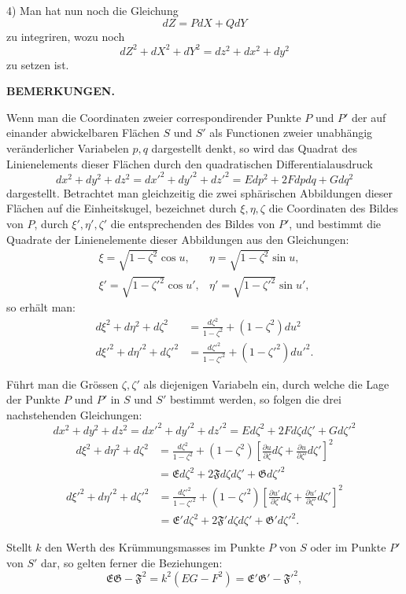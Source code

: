\par
4) Man hat nun noch die Gleichung
\[
dZ=PdX+QdY
\]
\noindent zu integriren, wozu noch
\[
dZ^2+dX^2+dY^2=dz^2+dx^2+dy^2
\]
\noindent zu setzen ist.

\begin{center}\textbf{BEMERKUNGEN.}\end{center}
\noindent\hspace*{1.2em}Wenn man die Coordinaten zweier correspondirender Punkte $P$ und $P'$ der auf einander abwickelbaren Flächen $S$ und $S'$ als Functionen zweier unabhängig veränderlicher Variabelen $p,q$ dargestellt denkt, so wird das Quadrat des Linienelements dieser Flächen durch den quadratischen Differentialausdruck
\[
dx^2+dy^2+dz^2=dx'^2+dy'^2+dz'^2=Edp^2+2Fdpdq+Gdq^2
\]
\noindent dargestellt. Betrachtet man gleichzeitig die zwei sphärischen Abbildungen dieser Flächen auf die Einheitskugel, bezeichnet durch $\xi,\eta,\zeta$ die Coordinaten des Bildes von $P$, durch $\xi',\eta',\zeta'$ die entsprechenden des Bildes von $P'$, und bestimmt die Quadrate der Linienelemente dieser Abbildungen aus den Gleichungen:
\[
\begin{array}{ll}
\xi=\sqrt{1-\zeta^2}\cos u,&\eta=\sqrt{1-\zeta^2}\sin u,\\[4pt]
\xi'=\sqrt{1-\zeta'^2}\cos u',&\eta'=\sqrt{1-\zeta'^2}\sin u',
\end{array}
\]
\noindent so erhält man:
\[
\begin{aligned}
d\xi^2+d\eta^2+d\zeta^2&=\frac{d\zeta^2}{1-\zeta^2}+(1-\zeta^2)du^2\\[5pt]
d\xi'^2+d\eta'^2+d\zeta'^2&=\frac{d\zeta'^2}{1-\zeta'^2}+(1-\zeta'^2)du'^2.
\end{aligned}
\]

\noindent Führt man die Grössen $\zeta,\zeta'$ als diejenigen Variabeln ein, durch welche die Lage der Punkte $P$ und $P'$ in $S$ und $S'$ bestimmt werden, so folgen die drei nachstehenden Gleichungen:
\[
dx^2+dy^2+dz^2=dx'^2+dy'^2+dz'^2=Ed\zeta^2+2Fd\zeta d\zeta'+Gd\zeta'^2
\]
\[
\begin{aligned}
d\xi^2+d\eta^2+d\zeta^2
&=\frac{d\zeta^2}{1-\zeta^2}+(1-\zeta^2)\left[\frac{\partial u}{\partial\zeta}d\zeta+\frac{\partial u}{\partial\zeta'}d\zeta'\right]^2\\
&=\mathfrak{E}d\zeta^2+2\mathfrak{F}d\zeta d\zeta'+\mathfrak{G}d\zeta'^2
\end{aligned}
\]
\[
\begin{aligned}
d\xi'^2+d\eta'^2+d\zeta'^2
&=\frac{d\zeta'^2}{1-\zeta'^2}+(1-\zeta'^2)\left[\frac{\partial u'}{\partial\zeta}d\zeta+\frac{\partial u'}{\partial\zeta'}d\zeta'\right]^2\\
&=\mathfrak{E}'d\zeta^2+2\mathfrak{F}'d\zeta d\zeta'+\mathfrak{G}'d\zeta'^2.
\end{aligned}
\]

\noindent Stellt $k$ den Werth des Krümmungsmasses im Punkte $P$ von $S$ oder im Punkte $P'$ von $S'$ dar, so gelten ferner die Beziehungen:
\[
\mathfrak{E}\mathfrak{G}-\mathfrak{F}^2=k^2(EG-F^2)=\mathfrak{E}'\mathfrak{G}'-\mathfrak{F}'^2,
\]

